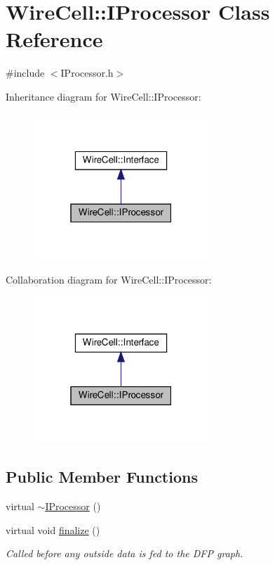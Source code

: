 \hypertarget{class_wire_cell_1_1_i_processor}{}\section{Wire\+Cell\+:\+:I\+Processor Class Reference}
\label{class_wire_cell_1_1_i_processor}


{\ttfamily \#include $<$I\+Processor.\+h$>$}



Inheritance diagram for Wire\+Cell\+:\+:I\+Processor\+:
\nopagebreak
\begin{figure}[H]
\begin{center}
\leavevmode
\includegraphics[width=187pt]{class_wire_cell_1_1_i_processor__inherit__graph}
\end{center}
\end{figure}


Collaboration diagram for Wire\+Cell\+:\+:I\+Processor\+:
\nopagebreak
\begin{figure}[H]
\begin{center}
\leavevmode
\includegraphics[width=187pt]{class_wire_cell_1_1_i_processor__coll__graph}
\end{center}
\end{figure}
\subsection*{Public Member Functions}
\begin{DoxyCompactItemize}
\item 
virtual \hyperlink{class_wire_cell_1_1_i_processor_a424d24be30cc6836936d24dc29070fb4}{$\sim$\+I\+Processor} ()
\item 
virtual void \hyperlink{class_wire_cell_1_1_i_processor_a0b2f1e45a2b8e7be61f3d4a47a6d8b82}{finalize} ()
\begin{DoxyCompactList}\small\item\em Called before any outside data is fed to the D\+FP graph. \end{DoxyCompactList}\end{DoxyCompactItemize}
